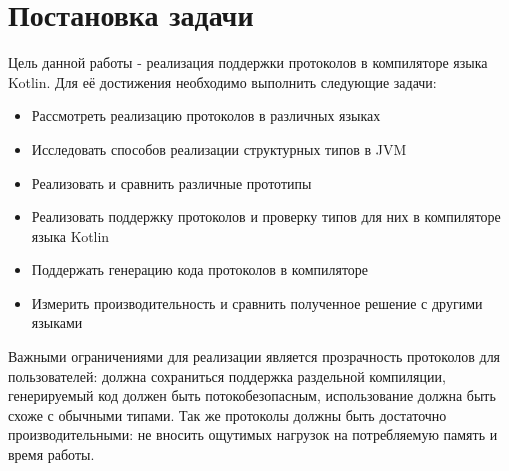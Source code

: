 \section*{Постановка задачи}
Цель данной работы - реализация поддержки протоколов в компиляторе языка Kotlin. Для её достижения необходимо выполнить следующие задачи:
\begin{itemize}
    \item Рассмотреть реализацию протоколов в различных языках
    \item Исследовать способов реализации структурных типов в JVM
    \item Реализовать и сравнить различные прототипы
    \item Реализовать поддержку протоколов и проверку типов для них в компиляторе языка Kotlin
    \item Поддержать генерацию кода протоколов в компиляторе
    \item Измерить производительность и сравнить полученное решение с другими языками
\end{itemize}

Важными ограничениями для реализации является прозрачность протоколов для пользователей: должна сохраниться поддержка раздельной компиляции, генерируемый код должен быть потокобезопасным, использование должна быть схоже с обычными типами. Так же протоколы должны быть достаточно производительными: не вносить ощутимых нагрузок на потребляемую память и время работы.